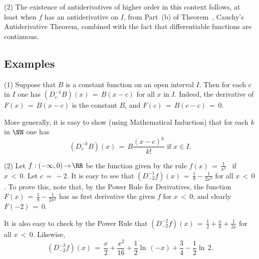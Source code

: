 {\V

        (2) The existence of antiderivatives of higher order in this context follows, at least when $f$ has an antiderivative on $I$,
    from Part~(b) of Theorem~, Cauchy's Antiderivative Theorem, combined with the fact that differentiable functions are continuous.


\VV

             \subsection{\small{\bf Examples}}
            \label{exampE45.90}

\V

\hspace*{\parindent}(1) Suppose that $B$ is a constant function on an open interval $I$.
    Then for each $c$ in $I$ one has $\left(D^{-1}_{c} B\right)(x) \,=\, B(x-c)$ for all $x$ in $I$.
    Indeed, the derivative of $F(x) \,=\, B(x-c)$ is the constant $B$, and $F(c) \,=\, B(c-c) \,=\, 0$.

        More generally, it is easy to show (using Mathematical Induction) that for each $k$ in ${\NN}$ one has
        \begin{equation}
        \label{EqnE.85}
        \left(D^{-k}_{c} B\right)(x) \,=\, B\frac{(x-c)^{k}}{k!} \mbox{ if $x{\in}I$}.
        \end{equation}

\V

        (2) Let $f:(-{\infty},0) \,{\rightarrow}\, {\RR}$ be the function given by the rule $f(x) \,=\,{\displaystyle  \frac{1}{x^{3}}}$ \mbox{ if $x\,<\,0$}.
    Let $c \,=\, -2$.
    It is easy to see that $\left(D^{-1}_{-2} f\right)(x) \,=\, {\displaystyle \frac{1}{8}-\frac{1}{2x^{2}}}$ for all $x\,<\,0$.
    To prove this, note that, by the Power Rule for Derivatives, the function ${\displaystyle F(x) \,=\, \frac{1}{8} - \frac{1}{2x^{2}}}$ has as first derivative the given $f$ for $x\,<\,0$; and clearly $F(-2) \,=\, 0$.

        It is also easy to check by the Power Rule that $\left(D^{-2}_{-2} f\right)(x) \,=\, {\displaystyle \frac{1}{2} + \frac{x}{8} + \frac{1}{2x}}$ for all $x\,<\,0$.
    Likewise,
        \begin{displaymath}
        (D^{-3}_{-2} f)(x) \,=\, \frac{x}{2} + \frac{x^{2}}{16} + \frac{1}{2}{\ln}\,(-x) + \frac{3}{4} -\frac{1}{2}{\ln}\,2.
        \end{displaymath}

}

